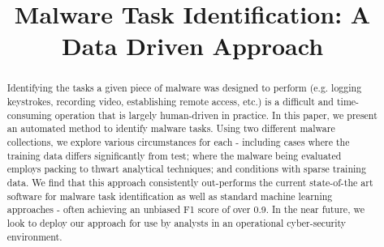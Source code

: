 \documentclass[conference]{IEEEtran}
\begin{document}
	\renewcommand{\thetable}{\arabic{table}}
	\renewcommand{\figurename}{Fig.}

\title{Malware Task Identification: A Data Driven Approach}


\author{
	\and
	\and
}


\maketitle

\begin{abstract}
	Identifying the tasks a given piece of malware was designed to perform (e.g. logging keystrokes, recording video, establishing remote access, etc.) is a difficult and time-consuming operation that is largely human-driven in practice.  In this paper, we present an automated method to identify malware tasks.  Using two different malware collections, we explore various circumstances for each - including cases where the training data differs significantly from test; where the malware being evaluated employs packing to thwart analytical techniques; and conditions with sparse training data.  We find that this approach consistently out-performs the current state-of-the art software for malware task identification as well as standard machine learning approaches - often achieving an unbiased F1 score of over 0.9.  In the near future, we look to deploy our approach for use by analysts in an operational cyber-security environment.
\end{abstract}
\end{document}

